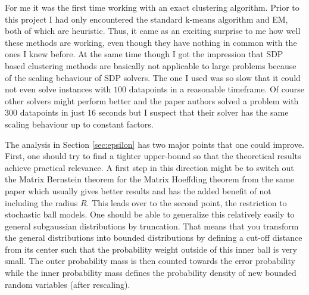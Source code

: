 \documentclass[10pt,a4paper]{article}
\begin{document}
For me it was the first time working with an exact clustering algorithm.
Prior to this project I had only encountered the standard k-means algorithm and EM, both of which are heuristic.
Thus, it came as an exciting surprise to me how well these methods are working, even though they have nothing in common with the ones I knew before.
At the same time though I got the impression that SDP based clustering methods are basically not applicable to large problems because of the scaling behaviour of SDP solvers.
The one I used was so slow that it could not even solve instances with $100$ datapoints in a reasonable timeframe.
Of course other solvers might perform better and the paper authors solved a problem with $300$ datapoints in just 16 seconds but I suspect that their solver has the same scaling behaviour up to constant factors.

The analysis in Section \ref{sec:epsilon} has two major points that one could improve.
First, one should try to find a tighter upper-bound so that the theoretical results achieve practical relevance.
A first step in this direction might be to switch out the Matrix Bernstein theorem for the Matrix Hoeffding theorem from the same paper \cite{tailbounds} which usually gives better results and has the added benefit of not including the radius $R$.
This leads over to the second point, the restriction to stochastic ball models.
One should be able to generalize this relatively easily to general subgaussian distributions by truncation.
That means that you transform the general distributions into bounded distributions by defining a cut-off distance from its center such that the probability weight outside of this inner ball is very small.
The outer probability mass is then counted towards the error probability while the inner probability mass defines the probability density of new bounded random variables (after rescaling).

{}

\end{document}
